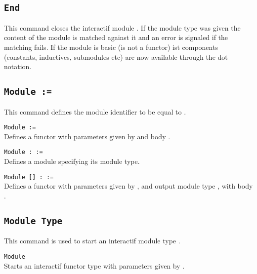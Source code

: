 \subsection{\tt End {\ident}}
This command closes the interactif module {\ident}. If the module type
was given the content of the module is matched against it and an error
is signaled if the matching fails. If the module is basic (is not a
functor) ist components (constants, inductives, submodules etc) are
now available through the dot notation.

\begin{ErrMsgs}
\item {}
\item {}
\item {}
\end{ErrMsgs}


\subsection{\tt Module {\ident} := {\modexpr}}
This command defines the module identifier {\ident} to be equal to \modexpr.

\begin{Variants}
\item{\tt Module \ident [\modbindings] := {\modexpr}}\\
  Defines a functor with parameters given by {\modbindings} and body \modexpr.
\item{\tt Module {\ident} \verb.:. {\modtype} := {\modexpr}}\\
  Defines a module specifying its module type.
\item{\tt Module {\ident} [\modbindings] \verb.:. {\modtype} := {\modexpr}}\\
  Defines a functor with parameters given by {\modbindings}, and
  output module type \modtype, with body {\modexpr}.
\end{Variants}

\subsection{\tt Module Type {\ident}}
This command is used to start an interactif module type {\ident}.

\begin{Variants}
\item{\tt Module \ident [\modbindings]}\\
  Starts an interactif functor type with parameters given by {\modbindings}.
\end{Variants}

